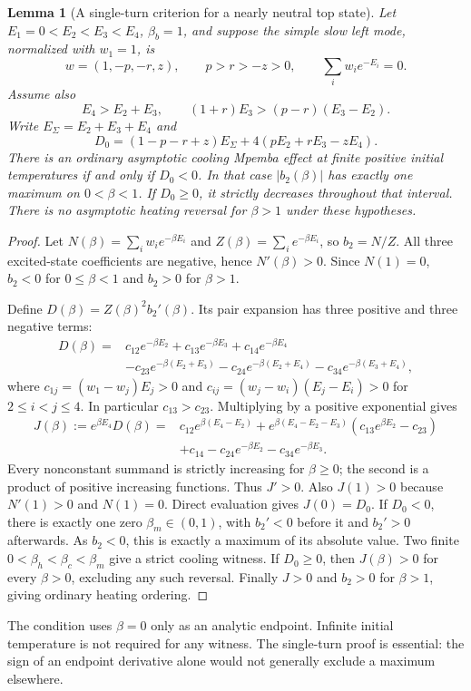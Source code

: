 \documentclass[11pt]{article}
\newtheorem{lemma}{Lemma}
\begin{document}
\begin{lemma}[A single-turn criterion for a nearly neutral top state]\label{lem:singleturn}
Let $E_1=0<E_2<E_3<E_4$, $\beta_b=1$, and suppose the simple slow left mode, normalized with $w_1=1$, is
\[
w=(1,-p,-r,z),\qquad p>r>-z>0,\qquad \sum_iw_i e^{-E_i}=0.
\]
Assume also
\[
E_4>E_2+E_3,\qquad (1+r)E_3>(p-r)(E_3-E_2).
\]
Write $E_\Sigma=E_2+E_3+E_4$ and
\[
D_0=(1-p-r+z)E_\Sigma+4(pE_2+rE_3-zE_4).
\]
There is an ordinary asymptotic cooling Mpemba effect at finite positive initial temperatures if and only if $D_0<0$. In that case $|b_2(\beta)|$ has exactly one maximum on $0<\beta<1$. If $D_0\geq0$, it strictly decreases throughout that interval. There is no asymptotic heating reversal for $\beta>1$ under these hypotheses.
\end{lemma}
\begin{proof}
Let $N(\beta)=\sum_iw_i e^{-\beta E_i}$ and $Z(\beta)=\sum_i e^{-\beta E_i}$, so $b_2=N/Z$. All three excited-state coefficients are negative, hence $N'(\beta)>0$. Since $N(1)=0$, $b_2<0$ for $0\leq\beta<1$ and $b_2>0$ for $\beta>1$.

Define $D(\beta)=Z(\beta)^2b_2'(\beta)$. Its pair expansion has three positive and three negative terms:
\begin{align*}
D(\beta)={}&c_{12}e^{-\beta E_2}+c_{13}e^{-\beta E_3}+c_{14}e^{-\beta E_4}\\
&-c_{23}e^{-\beta(E_2+E_3)}-c_{24}e^{-\beta(E_2+E_4)}-c_{34}e^{-\beta(E_3+E_4)},
\end{align*}
where $c_{1j}=(w_1-w_j)E_j>0$ and $c_{ij}=(w_j-w_i)(E_j-E_i)>0$ for $2\leq i<j\leq4$. In particular $c_{13}>c_{23}$. Multiplying by a positive exponential gives
\begin{align*}
J(\beta):=e^{\beta E_4}D(\beta)
={}&c_{12}e^{\beta(E_4-E_2)}
+e^{\beta(E_4-E_2-E_3)}(c_{13}e^{\beta E_2}-c_{23})\\
&+c_{14}-c_{24}e^{-\beta E_2}-c_{34}e^{-\beta E_3}.
\end{align*}
Every nonconstant summand is strictly increasing for $\beta\geq0$; the second is a product of positive increasing functions. Thus $J'>0$. Also $J(1)>0$ because $N'(1)>0$ and $N(1)=0$. Direct evaluation gives $J(0)=D_0$. If $D_0<0$, there is exactly one zero $\beta_m\in(0,1)$, with $b_2'<0$ before it and $b_2'>0$ afterwards. As $b_2<0$, this is exactly a maximum of its absolute value. Two finite $0<\beta_h<\beta_c<\beta_m$ give a strict cooling witness. If $D_0\geq0$, then $J(\beta)>0$ for every $\beta>0$, excluding any such reversal. Finally $J>0$ and $b_2>0$ for $\beta>1$, giving ordinary heating ordering.
\end{proof}
The condition uses $\beta=0$ only as an analytic endpoint. Infinite initial temperature is not required for any witness. The single-turn proof is essential: the sign of an endpoint derivative alone would not generally exclude a maximum elsewhere.
\end{document}
